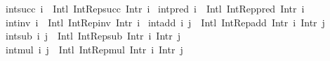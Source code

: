 \begin{isabellebody}
\isamarkupfalse%
\ {\isachardoublequoteopen}int{\isacharunderscore}{\kern0pt}succ\ i\ {\isasymequiv}\ Int{\isachardot}{\kern0pt}l\ {\isacharparenleft}{\kern0pt}Int{\isacharunderscore}{\kern0pt}Rep{\isacharunderscore}{\kern0pt}succ\ {\isacharparenleft}{\kern0pt}Int{\isachardot}{\kern0pt}r\ i{\isacharparenright}{\kern0pt}{\isacharparenright}{\kern0pt}{\isachardoublequoteclose}\isanewline
{}\isamarkupfalse%
\ {\isachardoublequoteopen}int{\isacharunderscore}{\kern0pt}pred\ i\ {\isasymequiv}\ Int{\isachardot}{\kern0pt}l\ {\isacharparenleft}{\kern0pt}Int{\isacharunderscore}{\kern0pt}Rep{\isacharunderscore}{\kern0pt}pred\ {\isacharparenleft}{\kern0pt}Int{\isachardot}{\kern0pt}r\ i{\isacharparenright}{\kern0pt}{\isacharparenright}{\kern0pt}{\isachardoublequoteclose}\isanewline
{}\isamarkupfalse%
\ {\isachardoublequoteopen}int{\isacharunderscore}{\kern0pt}inv\ i\ {\isasymequiv}\ Int{\isachardot}{\kern0pt}l\ {\isacharparenleft}{\kern0pt}Int{\isacharunderscore}{\kern0pt}Rep{\isacharunderscore}{\kern0pt}inv\ {\isacharparenleft}{\kern0pt}Int{\isachardot}{\kern0pt}r\ i{\isacharparenright}{\kern0pt}{\isacharparenright}{\kern0pt}{\isachardoublequoteclose}\isanewline
{}\isamarkupfalse%
\ {\isachardoublequoteopen}int{\isacharunderscore}{\kern0pt}add\ i\ j\ {\isasymequiv}\ Int{\isachardot}{\kern0pt}l\ {\isacharparenleft}{\kern0pt}Int{\isacharunderscore}{\kern0pt}Rep{\isacharunderscore}{\kern0pt}add\ {\isacharparenleft}{\kern0pt}Int{\isachardot}{\kern0pt}r\ i{\isacharparenright}{\kern0pt}\ {\isacharparenleft}{\kern0pt}Int{\isachardot}{\kern0pt}r\ j{\isacharparenright}{\kern0pt}{\isacharparenright}{\kern0pt}{\isachardoublequoteclose}\isanewline
{}\isamarkupfalse%
\ {\isachardoublequoteopen}int{\isacharunderscore}{\kern0pt}sub\ i\ j\ {\isasymequiv}\ Int{\isachardot}{\kern0pt}l\ {\isacharparenleft}{\kern0pt}Int{\isacharunderscore}{\kern0pt}Rep{\isacharunderscore}{\kern0pt}sub\ {\isacharparenleft}{\kern0pt}Int{\isachardot}{\kern0pt}r\ i{\isacharparenright}{\kern0pt}\ {\isacharparenleft}{\kern0pt}Int{\isachardot}{\kern0pt}r\ j{\isacharparenright}{\kern0pt}{\isacharparenright}{\kern0pt}{\isachardoublequoteclose}\isanewline
{}\isamarkupfalse%
\ {\isachardoublequoteopen}int{\isacharunderscore}{\kern0pt}mul\ i\ j\ {\isasymequiv}\ Int{\isachardot}{\kern0pt}l\ {\isacharparenleft}{\kern0pt}Int{\isacharunderscore}{\kern0pt}Rep{\isacharunderscore}{\kern0pt}mul\ {\isacharparenleft}{\kern0pt}Int{\isachardot}{\kern0pt}r\ i{\isacharparenright}{\kern0pt}\ {\isacharparenleft}{\kern0pt}Int{\isachardot}{\kern0pt}r\ j{\isacharparenright}{\kern0pt}{\isacharparenright}{\kern0pt}{\isachardoublequoteclose}\isanewline

\end{isabellebody}
